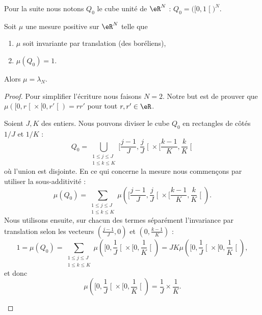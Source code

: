 Pour la suite nous notons \( Q_0\) le cube unité de \( \eR^N\) : \( Q_0=\big( \mathopen[ 0 , 1 \mathclose[ \big)^N\).

\begin{theorem}        \label{ThoCABFooHbUzWc}
	Soit \( \mu\) une mesure positive sur \( \eR^N\) telle que
	\begin{enumerate}
		\item
		      \( \mu\) soit invariante par translation (des boréliens),
		\item
		      \( \mu(Q_0)=1\).
	\end{enumerate}
	Alors \( \mu=\lambda_N\).
\end{theorem}

\begin{proof}
	Pour simplifier l'écriture nous faisons \( N=2\). Notre but est de prouver que \( \mu(  \mathopen[ 0 , r \mathclose[\times \mathopen[ 0 , r' \mathclose[ )=rr'\) pour tout \( r,r'\in \eR\).

	\begin{subproof}
		\spitem[Longueur =\( 1/J\)]
		Soient \( J,K\) des entiers. Nous pouvons diviser le cube \( Q_0\) en rectangles de côtés \( 1/J\) et \( 1/K\) :
		\begin{equation}
			Q_0=\bigcup_{\substack{1\leq j\leq J\\1\leq k\leq K}}\mathopen[ \frac{ j-1 }{ J } , \frac{ j }{ J } \mathclose[\times \mathopen[ \frac{ k-1 }{ K } , \frac{ k }{ K } \mathclose[
		\end{equation}
		où l'union est disjointe. En ce qui concerne la mesure nous commençons par utiliser la sous-additivité :
		\begin{equation}
			\mu(Q_0)=\sum_{\substack{1\leq j\leq J\\1\leq k\leq K}}\mu\left(  \mathopen[ \frac{ j-1 }{ J } , \frac{ j }{ J } \mathclose[\times \mathopen[ \frac{ k-1 }{ K } , \frac{ k }{ K } \mathclose[      \right).
		\end{equation}
		Nous utilisons ensuite, sur chacun des termes séparément l'invariance par translation selon les vecteurs \( (\frac{ j-1 }{ J },0)\) et \( ( 0,\frac{ k-1 }{ K } )\) :
		\begin{equation}
			1=\mu(Q_0)=\sum_{\substack{1\leq j\leq J\\1\leq k\leq K}}\mu\left(  \mathopen[ 0,\frac{1}{ J } \mathclose[\times \mathopen[0,\frac{1}{ K }\mathclose[      \right)=JK\mu\left(  \mathopen[ 0,\frac{1}{ J } \mathclose[\times \mathopen[0,\frac{1}{ K }\mathclose[      \right),
		\end{equation}
		et donc
		\begin{equation}
			\mu\left(  \mathopen[ 0,\frac{1}{ J } \mathclose[\times \mathopen[0,\frac{1}{ K }\mathclose[      \right)=\frac{1}{ J }\times \frac{1}{ K }.
		\end{equation}
		\spitem[Longueur \( L/K\)]


\end{subproof}
\end{proof}
